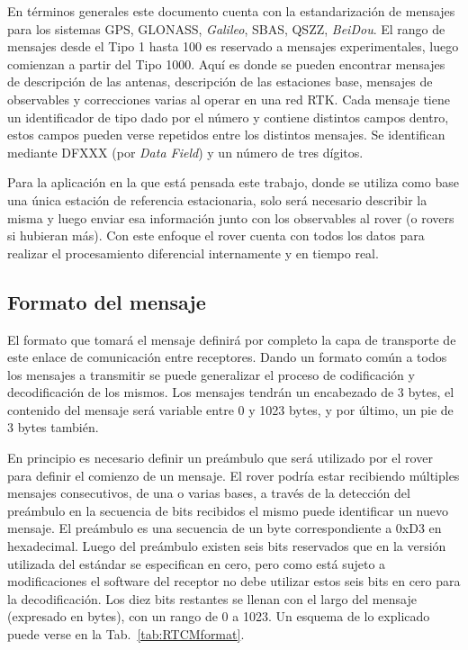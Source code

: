 \documentclass[a4paper,12pt,oneside,onecolumn,final,openright]{book}%
\begin{document}
	En términos generales este documento cuenta con la estandarización de mensajes para los sistemas GPS, GLONASS, \textit{Galileo}, SBAS, QSZZ, \textit{BeiDou}. El rango de mensajes desde el Tipo 1 hasta 100 es reservado a mensajes experimentales, luego comienzan a partir del Tipo 1000. Aquí es donde se pueden encontrar mensajes de descripción de las antenas, descripción de las estaciones base, mensajes de observables y correcciones varias al operar en una red RTK. Cada mensaje tiene un identificador de tipo dado por el número y contiene distintos campos dentro, estos campos pueden verse repetidos entre los distintos mensajes. Se identifican mediante DFXXX (por \textit{Data Field}) y un número de tres dígitos. 
	
	Para la aplicación en la que está pensada este trabajo, donde se utiliza como base una única estación de referencia estacionaria, solo será necesario describir la misma y luego enviar esa información junto con los observables al rover (o rovers si hubieran más). Con este enfoque el rover cuenta con todos los datos para realizar el procesamiento diferencial internamente y en tiempo real.
\subsection{Formato del mensaje}\label{sec:RTCM_format}
	El formato que tomará el mensaje definirá por completo la capa de transporte de este enlace de comunicación entre receptores. Dando un formato común a todos los mensajes a transmitir se puede generalizar el proceso de codificación y decodificación de los mismos. Los mensajes tendrán un encabezado de 3 bytes, el contenido del mensaje será variable entre 0 y 1023 bytes, y por último, un pie de 3 bytes también.
	
	En principio es necesario definir un preámbulo que será utilizado por el rover para definir el comienzo de un mensaje. El rover podría estar recibiendo múltiples mensajes consecutivos, de una o varias bases, a través de la detección del preámbulo en la secuencia de bits recibidos el mismo puede identificar un nuevo mensaje. El preámbulo es una secuencia de un byte correspondiente a 0xD3 en hexadecimal. Luego del preámbulo existen seis bits reservados que en la versión utilizada del estándar se especifican en cero, pero como está sujeto a modificaciones el software del receptor no debe utilizar estos seis bits en cero para la decodificación. Los diez bits restantes se llenan con el largo del mensaje (expresado en bytes), con un rango de 0 a 1023. Un esquema de lo explicado puede verse en la Tab.~\ref{tab:RTCMformat}.
	
\end{document}
